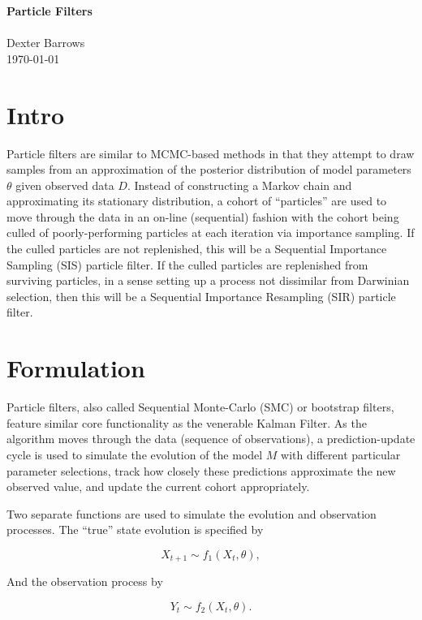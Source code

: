 \documentclass[12pt]{article}
\begin{document}
\noindent
{\LARGE {\bf Particle Filters} }
\\\\
Dexter Barrows\\
\today

\section{Intro}

	Particle filters are similar to MCMC-based methods in that they attempt to draw samples from an approximation of the posterior distribution of model parameters $\theta$ given observed data $D$. Instead of constructing a Markov chain and approximating its stationary distribution, a cohort of ``particles'' are used to move through the data in an on-line (sequential) fashion with the cohort being culled of poorly-performing particles at each iteration via importance sampling. If the culled particles are not replenished, this will be a Sequential Importance Sampling (SIS) particle filter. If the culled particles are replenished from surviving particles, in a sense setting up a process not dissimilar from Darwinian selection, then this will be a Sequential Importance Resampling (SIR) particle filter.

\section{Formulation}

	Particle filters, also called Sequential Monte-Carlo (SMC) or bootstrap filters, feature similar core functionality as the venerable Kalman Filter. As the algorithm moves through the data (sequence of observations), a prediction-update cycle is used to simulate the evolution of the model $M$ with different particular parameter selections, track how closely these predictions approximate the new observed value, and update the current cohort appropriately.

	Two separate functions are used to simulate the evolution and observation processes. The ``true'' state evolution is specified by

	\begin{equation}
		X_{t+1} \sim f_1 (X_t, \theta),
	\end{equation}

	And the observation process by

	\begin{equation}
		Y_t \sim f_2 (X_t, \theta).
	\end{equation}
\end{document}
